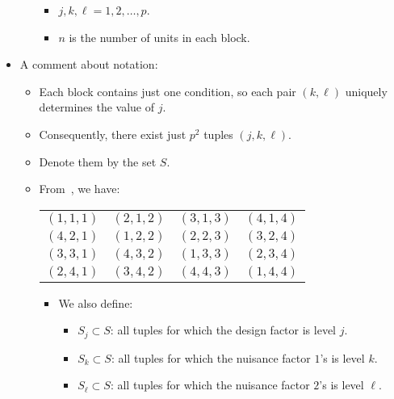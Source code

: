 \begin{itemize}
\begin{itemize}
\begin{itemize}
                        \item $ j,k,\ell=1,2,\ldots,p $.
                        \item $ n $ is the number of units in each block.
                    \end{itemize}
          \end{itemize}
    \item A comment about notation:
          \begin{itemize}
              \item Each block contains just one condition, so each pair $(k, \ell)$ uniquely determines the value of $j$.
              \item Consequently, there exist just $p^2$ tuples $(j, k, \ell)$.
              \item Denote them by the set $ S $.
              \item From~, we have:
                    \begin{table}[!htbp]
                        \centering
                        \begin{NiceTabular}{|cccc|}
                            \toprule
                            $ (1,1,1) $ & $ (2,1,2) $ & $ (3,1,3) $ & $ (4,1,4) $\\
                            $ (4,2,1) $ & $ (1,2,2) $ & $ (2,2,3) $ & $ (3,2,4) $\\
                            $ (3,3,1) $ & $ (4,3,2) $ & $ (1,3,3) $ & $ (2,3,4) $\\
                            $ (2,4,1) $ & $ (3,4,2) $ & $ (4,4,3) $ & $ (1,4,4) $\\
                            \bottomrule
                        \end{NiceTabular}
                    \end{table}
                    \begin{itemize}
                        \item We also define:
                              \begin{itemize}
                                  \item $ S_j\subset S $: all tuples for which the design factor is level $ j $.
                                  \item $ S_k\subset S $: all tuples for which the nuisance factor $ 1 $'s is level $ k $.
                                  \item $ S_\ell\subset S $: all tuples for which the nuisance factor $ 2 $'s is level $ \ell $.

\end{itemize}
\end{itemize}
\end{itemize}
\end{itemize}
